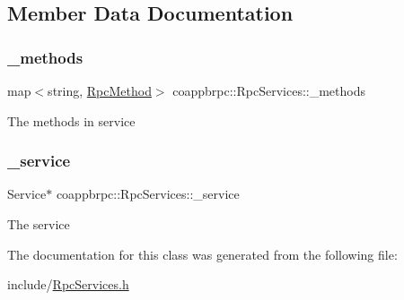 \subsection{Member Data Documentation}
\mbox{\label{classcoappbrpc_1_1RpcServices_a429ceb54bd91716fd358c9045e262506}} 
\subsubsection{\texorpdfstring{\+\_\+methods}{\_methods}}
{\footnotesize\ttfamily map$<$string, \hyperlink{classcoappbrpc_1_1RpcMethod}{Rpc\+Method}$>$ coappbrpc\+::\+Rpc\+Services\+::\+\_\+methods}

The methods in service \mbox{\label{classcoappbrpc_1_1RpcServices_a0acd95e0c580d1478a9034de3b854d5c}} 
\subsubsection{\texorpdfstring{\+\_\+service}{\_service}}
{\footnotesize\ttfamily Service$\ast$ coappbrpc\+::\+Rpc\+Services\+::\+\_\+service}

The service 

The documentation for this class was generated from the following file\+:\begin{DoxyCompactItemize}
\item 
include/\hyperlink{RpcServices_8h}{Rpc\+Services.\+h}\end{DoxyCompactItemize}
